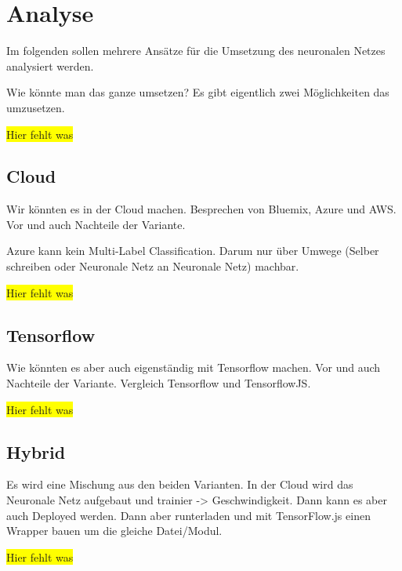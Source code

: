 \section{Analyse}
Im folgenden sollen mehrere Ansätze für die Umsetzung des neuronalen Netzes analysiert werden.

Wie könnte man das ganze umsetzen? Es gibt eigentlich zwei Möglichkeiten das umzusetzen.

\colorbox{yellow}{Hier fehlt was}

\subsection{Cloud}
Wir könnten es in der Cloud machen. Besprechen von Bluemix, Azure und AWS. Vor und auch Nachteile der Variante.

Azure kann kein Multi-Label Classification. Darum nur über Umwege (Selber schreiben oder Neuronale Netz an Neuronale Netz)
machbar.

\colorbox{yellow}{Hier fehlt was}

\subsection{Tensorflow}
Wie könnten es aber auch eigenständig mit Tensorflow machen. Vor und auch Nachteile der Variante. Vergleich Tensorflow
und TensorflowJS.

\colorbox{yellow}{Hier fehlt was}

\subsection{Hybrid}
Es wird eine Mischung aus den beiden Varianten. In der Cloud wird das Neuronale Netz aufgebaut und trainier -> Geschwindigkeit.
Dann kann es aber auch Deployed werden. Dann aber runterladen und mit TensorFlow.js einen Wrapper bauen um die gleiche
Datei/Modul.

\colorbox{yellow}{Hier fehlt was}